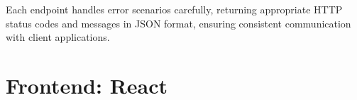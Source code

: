 \documentclass[a4paper,12pt]{article}
\begin{document}
Each endpoint handles error scenarios carefully, returning appropriate HTTP status codes and messages in JSON format, ensuring consistent communication with client applications.


\newpage
\section{Frontend: React}
\justify
\end{document}
